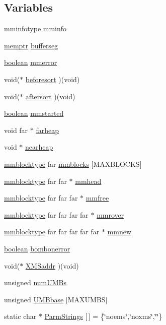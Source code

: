 \subsection*{Variables}
\begin{DoxyCompactItemize}
\item 
\hyperlink{structmminfotype}{mminfotype} \hyperlink{ID__MM_8C_ac3be51de4543720a019084a1445fe497}{mminfo}
\item 
\hyperlink{ID__MM_8H_a04062decc7eb282b066c65e9137bb9bf}{memptr} \hyperlink{ID__MM_8C_a08b9369ae972be8f272065cdf755c4f7}{bufferseg}
\item 
\hyperlink{ID__HEAD_8H_a7c6368b321bd9acd0149b030bb8275ed}{boolean} \hyperlink{ID__MM_8C_ae7aac7996350e0ba6ec288d45c450b68}{mmerror}
\item 
void($\ast$ \hyperlink{ID__MM_8C_a615c8b50b8f67f423250c0ac676a9809}{beforesort} )(void)
\item 
void($\ast$ \hyperlink{ID__MM_8C_ae0417d5723e6713c09a179a9c89b1f14}{aftersort} )(void)
\item 
\hyperlink{ID__HEAD_8H_a7c6368b321bd9acd0149b030bb8275ed}{boolean} \hyperlink{ID__MM_8C_ad8f4bbba342cb366093cbf387ee765e0}{mmstarted}
\item 
void far $\ast$ \hyperlink{ID__MM_8C_af6225e828577deb78408396b668247b3}{farheap}
\item 
void $\ast$ \hyperlink{ID__MM_8C_ac7faf2fe2aacd6309c7ccc8c000fd384}{nearheap}
\item 
\hyperlink{structmmblockstruct}{mmblocktype} far \hyperlink{ID__MM_8C_ab30f9819af4fc84362a9a65dc7e75c92}{mmblocks} \mbox{[}MAXBLOCKS\mbox{]}
\item 
\hyperlink{structmmblockstruct}{mmblocktype} far far $\ast$ \hyperlink{ID__MM_8C_a333674074ebb771f34d9bb3386fc6ce2}{mmhead}
\item 
\hyperlink{structmmblockstruct}{mmblocktype} far far far $\ast$ \hyperlink{ID__MM_8C_abdac14ac0a96a28e4b111015263bd9fa}{mmfree}
\item 
\hyperlink{structmmblockstruct}{mmblocktype} far far far far $\ast$ \hyperlink{ID__MM_8C_aca288c079a7723294af053529cd35cfb}{mmrover}
\item 
\hyperlink{structmmblockstruct}{mmblocktype} far far far far far $\ast$ \hyperlink{ID__MM_8C_ae7f89fec09993591be9e423abd165413}{mmnew}
\item 
\hyperlink{ID__HEAD_8H_a7c6368b321bd9acd0149b030bb8275ed}{boolean} \hyperlink{ID__MM_8C_aa0256f88979feb018bba721a5fcf118e}{bombonerror}
\item 
void($\ast$ \hyperlink{ID__MM_8C_a2930e4b216dbf278c4e5240d6a91838a}{XMSaddr} )(void)
\item 
unsigned \hyperlink{ID__MM_8C_a43127bf93728af9cfda3afb6ab3def5d}{numUMBs}
\item 
unsigned \hyperlink{ID__MM_8C_a81cb635daffbf2fe86d9a814a0e98de1}{UMBbase} \mbox{[}MAXUMBS\mbox{]}
\item 
static char $\ast$ \hyperlink{ID__MM_8C_af8599e1c1fbb3afabbdaa22e7c4a94b0}{ParmStrings} \mbox{[}$\,$\mbox{]} = \{\char`\"{}noems\char`\"{},\char`\"{}noxms\char`\"{},\char`\"{}\char`\"{}\}
\end{DoxyCompactItemize}


